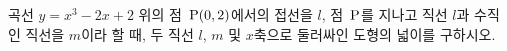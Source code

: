 곡선 $y=x^3-2x+2$ 위의 점~$\mathrm{P}(0{,}\mkern3mu\mathopen{}2)$에서의 접선을 $l$, 점~$\mathrm{P}$를 지나고 직선 $l$과 수직인 직선을 $m$이라 할 때, 두 직선 $l$, $m$ 및 $x$축으로 둘러싸인 도형의 넓이를 구하시오.
